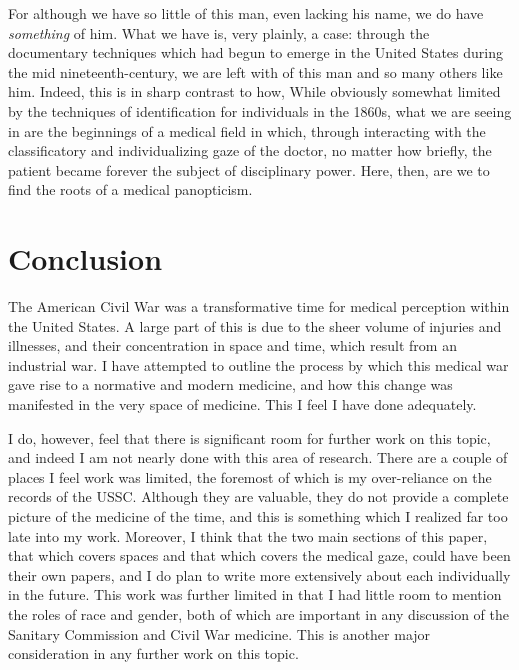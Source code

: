 \documentclass[12pt]{article}
\begin{document}
For although we have so little of this man, even lacking his name, we do have \textit{something} of him. What we have is, very plainly, a case: through the
documentary techniques which had begun to emerge in the United States during the mid nineteenth-century, we are left with  of this man and so many
others like him. Indeed, this is in sharp contrast to how, \autocite[191]{Foucault1995}
While obviously somewhat limited by the techniques of identification for individuals in the 1860s, what we are seeing in  are the beginnings of a medical field in which, through interacting with the classificatory and individualizing gaze of the
doctor, no matter how briefly, the patient became forever the subject of disciplinary power. Here, then, are we to find the roots of a medical panopticism.

\renewcommand{\thesec}{Conclusion}
\section{\thesec}
The American Civil War was a transformative time for medical perception within the United States. A large part of this is due to the sheer volume of injuries
and illnesses, and their concentration in space and time, which result from an industrial war. I have attempted to outline the process by which this medical
war gave rise to a normative and modern medicine, and how this change was manifested in the very space of medicine. This I feel I have done adequately.

I do, however, feel that there is significant room for further work on this topic, and indeed I am not nearly done with this area of research. There are
a couple of places I feel work was limited, the foremost of which is my over-reliance on the records of the USSC. Although they are valuable, they do not
provide a complete picture of the medicine of the time, and this is something which I realized far too late into my work. Moreover, I think that the two main
sections of this paper, that which covers spaces and that which covers the medical gaze, could have been their own papers, and I do plan to write more extensively
about each individually in the future. This work was further limited in that I had little room to mention the roles of race and gender, both of which are important in
any discussion of the Sanitary Commission and Civil War medicine.\autocite{schwalm2018body} This is another major consideration in any further work on this topic.
\end{document}
